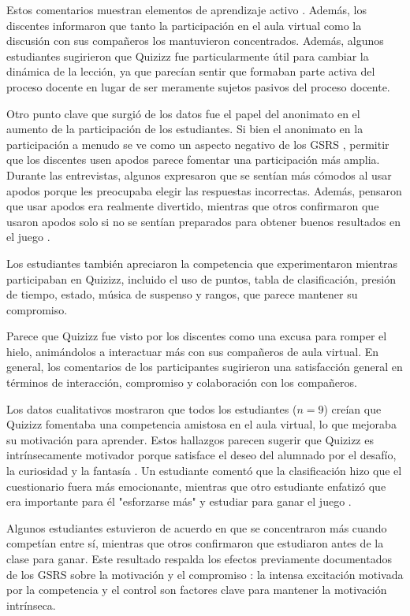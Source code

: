 \documentclass[spanish]{textolivre}
\begin{document}
Estos comentarios muestran elementos de aprendizaje activo \cite{dakka2015}. Además, los discentes informaron que tanto la participación en el aula virtual como la discusión con sus compañeros los mantuvieron concentrados. Además, algunos estudiantes sugirieron que Quizizz fue particularmente útil para cambiar la dinámica de la lección, ya que parecían sentir que formaban parte activa del proceso docente en lugar de ser meramente sujetos pasivos del proceso docente.

Otro punto clave que surgió de los datos fue el papel del anonimato en el aumento de la participación de los estudiantes. Si bien el anonimato en la participación a menudo se ve como un aspecto negativo de los GSRS \cite{nielsen2013}, permitir que los discentes usen apodos parece fomentar una participación más amplia. Durante las entrevistas, algunos expresaron que se sentían más cómodos al usar apodos porque les preocupaba elegir las respuestas incorrectas. Además, pensaron que usar apodos era realmente divertido, mientras que otros confirmaron que usaron apodos solo si no se sentían preparados para obtener buenos resultados en el juego \cite{bottentuit2020, licorish2018}.

Los estudiantes también apreciaron la competencia que experimentaron mientras participaban en Quizizz, incluido el uso de puntos, tabla de clasificación, presión de tiempo, estado, música de suspenso y rangos, que parece mantener su compromiso.

Parece que Quizizz fue visto por los discentes como una excusa para romper el hielo, animándolos a interactuar más con sus compañeros de aula virtual. En general, los comentarios de los participantes sugirieron una satisfacción general en términos de interacción, compromiso y colaboración con los compañeros.

Los datos cualitativos mostraron que todos los estudiantes ($n = 9$) creían que Quizizz fomentaba una competencia amistosa en el aula virtual, lo que mejoraba su motivación para aprender. Estos hallazgos parecen sugerir que Quizizz es intrínsecamente motivador porque satisface el deseo del alumnado por el desafío, la curiosidad y la fantasía \cite{malone1981}. Un estudiante comentó que la clasificación hizo que el cuestionario fuera más emocionante, mientras que otro estudiante enfatizó que era importante para él "esforzarse más" y estudiar para ganar el juego \cite{iaremenko2017}.

Algunos estudiantes estuvieron de acuerdo en que se concentraron más cuando competían entre sí, mientras que otros confirmaron que estudiaron antes de la clase para ganar. Este resultado respalda los efectos previamente documentados de los GSRS sobre la motivación y el compromiso \cite{grinias2017, malone1981, wang2020}: la intensa excitación motivada por la competencia y el control son factores clave para mantener la motivación intrínseca.
\end{document}
